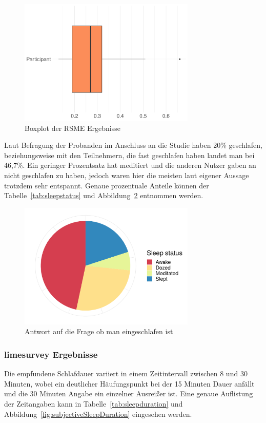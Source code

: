 \begin{figure}[H]
	\centering
	\includegraphics[width=0.75\textwidth]{./_StudyResults/rsme}
	\caption{Boxplot der RSME Ergebnisse}
	\label{fig:rsme_vis}
\end{figure}

Laut Befragung der Probanden im Anschluss an die Studie haben 20\% geschlafen, beziehungsweise mit den Teilnehmern, die fast geschlafen haben landet man bei 46,7\%. Ein geringer Prozentsatz hat meditiert und die anderen Nutzer gaben an nicht geschlafen zu haben, jedoch waren hier die meisten laut eigener Aussage trotzdem sehr entspannt. Genaue prozentuale Anteile können der Tabelle~\ref{tab:sleepstatus} und Abbildung~\ref{fig:slept} entnommen werden.

\begin{figure}[H]
	\centering
	\includegraphics[width=0.75\textwidth]{./_StudyResults/slept}
	\caption{Antwort auf die Frage ob man eingeschlafen ist}
	\label{fig:slept}
\end{figure}

\subsubsection{limesurvey Ergebnisse}
Die empfundene Schlafdauer variiert in einem Zeitintervall zwischen 8 und 30 Minuten, wobei ein deutlicher Häufungspunkt bei der 15 Minuten Dauer anfällt und die 30 Minuten Angabe ein einzelner Ausreißer ist. Eine genaue Auflistung der Zeitangaben kann in Tabelle~\ref{tab:sleepduration} und Abbildung~\ref{fig:subjectiveSleepDuration} eingesehen werden.

